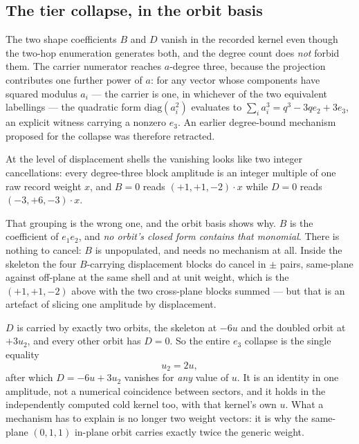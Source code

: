 \documentclass[11pt]{article}
\theoremstyle{plain}
\theoremstyle{definition}
\theoremstyle{remark}
\newcommand{\chk}[1]{}
\begin{document}
\subsection{The tier collapse, in the orbit basis}

The two shape coefficients $B$ and $D$ vanish in the recorded kernel even
though the two-hop enumeration generates both, and the degree count does
\emph{not} forbid them. The carrier numerator reaches $a$-degree three, because
the projection contributes one further power of $a$: for any vector whose
components have squared modulus $a_i$ --- the carrier is one, in whichever of
the two equivalent labellings --- the quadratic form $\mathrm{diag}(a_i^2)$
evaluates to $\sum_i a_i^3=q^3-3qe_2+3e_3$, an explicit witness carrying a
nonzero $e_3$. An earlier degree-bound mechanism proposed for the collapse was
therefore retracted.
\chk{RETRACTED: the vertex count does NOT forbid B\_shp and D\_shp}
\chk{the vanishing coefficients are exactly the degree-3 ones}

At the level of displacement shells the vanishing looks like two integer
cancellations: every degree-three block amplitude is an integer multiple of one
raw record weight $x$, and $B=0$ reads $(+1,+1,-2)\cdot x$ while $D=0$ reads
$(-3,+6,-3)\cdot x$.
\chk{FINDING: the tier collapse is two integer cancellations at record level}
That grouping is the wrong one, and the orbit basis shows why. $B$ is the
coefficient of $e_1e_2$, and \emph{no orbit's closed form contains that
monomial}. There is nothing to cancel: $B$ is unpopulated, and needs no
mechanism at all. Inside the skeleton the four $B$-carrying displacement blocks
do cancel in $\pm$ pairs, same-plane against off-plane at the same shell and at
unit weight, which is the $(+1,+1,-2)$ above with the two cross-plane blocks
summed --- but that is an artefact of slicing one amplitude by displacement.
\chk{B = 0 is unpopulated, not cancelled}

$D$ is carried by exactly two orbits, the skeleton at $-6u$ and the doubled
orbit at $+3u_2$, and every other orbit has $D=0$. So the entire $e_3$ collapse
is the single equality
\[
  u_2=2u ,
\]
after which $D=-6u+3u_2$ vanishes for \emph{any} value of $u$. It is an
identity in one amplitude, not a numerical coincidence between sectors, and it
holds in the independently computed cold kernel too, with that kernel's own
$u$. What a mechanism has to explain is no longer two weight vectors: it is why
the same-plane $(0,1,1)$ in-plane orbit carries exactly twice the generic
weight.
\chk{the tier collapse is one identity: D = -6u + 3*u2 with u2 = 2u}
\end{document}
